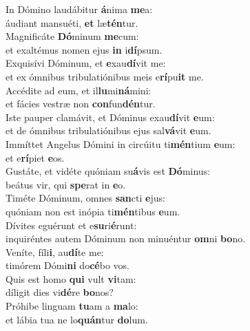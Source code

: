 \evenverse In Dómino laudábitur \textbf{á}nima \textbf{me}a:~\*\\
\evenverse áudiant mansuéti, \textbf{et} læ\textbf{tén}tur.\\
\oddverse Magnificáte \textbf{Dó}minum \textbf{me}cum:~\*\\
\oddverse et exaltémus nomen ejus \textbf{in} i\textbf{dí}psum.\\
\evenverse Exquisívi Dóminum, et \textbf{e}xau\textbf{dí}vit me:~\*\\
\evenverse et ex ómnibus tribulatiónibus meis e\textbf{rí}pu\textbf{it} me.\\
\oddverse Accédite ad eum, et il\textbf{lu}mi\textbf{ná}mini:~\*\\
\oddverse et fácies vestræ non \textbf{con}fun\textbf{dén}tur.\\
\evenverse Iste pauper clamávit, et Dóminus exau\textbf{dí}vit \textbf{e}um:~\*\\
\evenverse et de ómnibus tribulatiónibus ejus sal\textbf{vá}vit \textbf{e}um.\\
\oddverse Immíttet Angelus Dómini in circúitu ti\textbf{mén}tium \textbf{e}um:~\*\\
\oddverse et e\textbf{rí}piet \textbf{e}os.\\
\evenverse Gustáte, et vidéte quóniam su\textbf{á}vis est \textbf{Dó}minus:~\*\\
\evenverse beátus vir, qui \textbf{spe}rat in \textbf{e}o.\\
\oddverse Timéte Dóminum, omnes \textbf{san}cti \textbf{e}jus:~\*\\
\oddverse quóniam non est inópia ti\textbf{mén}tibus \textbf{e}um.\\
\evenverse Dívites eguérunt et e\textbf{su}ri\textbf{é}runt:~\*\\
\evenverse inquiréntes autem Dóminum non minuéntur \textbf{om}ni \textbf{bo}no.\\
\oddverse Veníte, fíli\textbf{i}, au\textbf{dí}te me:~\*\\
\oddverse timórem Dómi\textbf{ni} do\textbf{cé}bo vos.\\
\evenverse Quis est homo \textbf{qui} vult \textbf{vi}tam:~\*\\
\evenverse díligit dies vi\textbf{dé}re \textbf{bo}nos?\\
\oddverse Próhibe linguam \textbf{tu}am a \textbf{ma}lo:~\*\\
\oddverse et lábia tua ne lo\textbf{quán}tur \textbf{do}lum.\\
